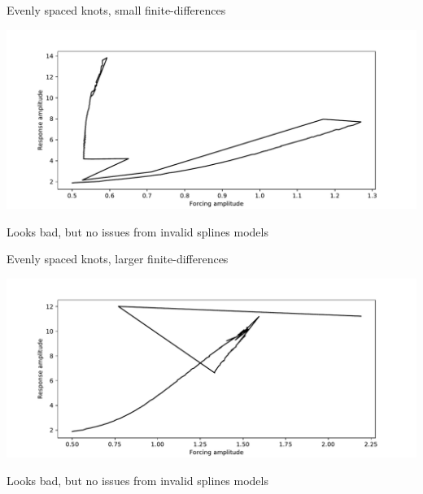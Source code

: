 \documentclass[presentation]{beamer}
\begin{document}
\begin{frame}[label={sec:orge002e32}]{Evenly spaced knots, small finite-differences}
\begin{center}
\includegraphics[width=.9\linewidth]{./spline_fail.pdf}
\end{center}

Looks bad, but no issues from invalid splines models
\end{frame}

\begin{frame}[label={sec:orgf532dac}]{Evenly spaced knots, larger finite-differences}
\begin{center}
\includegraphics[width=.9\linewidth]{./spline_fail_larger_finite_differences.pdf}
\end{center}

Looks bad, but no issues from invalid splines models
\end{frame}
\end{document}
